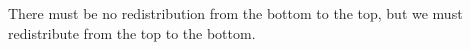 There must be no redistribution from the bottom to the top, but we must redistribute from the top to the bottom.
